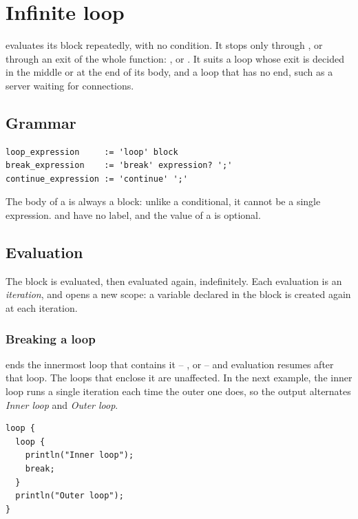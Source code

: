 \vfill%
\pagebreak
\section{Infinite loop}%
\label{sec:flow:inf_loop}

 evaluates its block repeatedly, with no condition. It stops only
through , or through an exit of the whole function:
,  or . It suits a loop whose exit is
decided in the middle or at the end of its body, and a loop that has no end,
such as a server waiting for connections.

\subsection{Grammar}

\begin{lstlisting}[style=grammarVerb]
loop_expression     := 'loop' block
break_expression    := 'break' expression? ';'
continue_expression := 'continue' ';'
\end{lstlisting}

The body of a  is always a block: unlike a conditional, it cannot be
a single expression.  and  have no label, and the
value of a  is optional.

\subsection{Evaluation}

The block is evaluated, then evaluated again, indefinitely. Each evaluation is an
\textit{iteration}, and opens a new scope: a variable declared in the block is
created again at each iteration.

\subsubsection{Breaking a loop}
\label{sec:flow:breaking_loops}

 ends the innermost loop that contains it -- ,
 or  -- and evaluation resumes after that loop. The
loops that enclose it are unaffected. In the next example, the inner loop runs a
single iteration each time the outer one does, so the output alternates
\textit{Inner loop} and \textit{Outer loop}.

\begin{lstlisting}[style=coloredverbatim]
loop {
  loop {
    println("Inner loop");
    break;
  }
  println("Outer loop");
}
\end{lstlisting}

